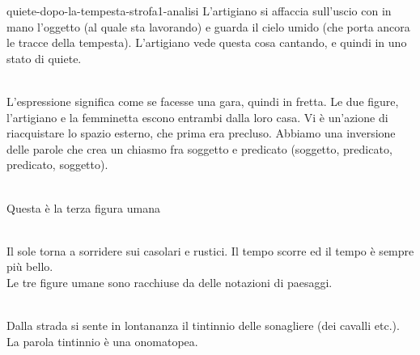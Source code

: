 \documentclass[preview]{standalone}
\begin{document}
\begin{snippet}{quiete-dopo-la-tempesta-strofa1-analisi}
    L'artigiano si affaccia sull'uscio con in mano l'oggetto (al quale sta lavorando)
    e guarda il cielo umido (che porta ancora le tracce della tempesta).
    L'artigiano vede questa cosa cantando, e quindi in uno stato di quiete.
    \\\\

    L'espressione  significa come se facesse una gara, quindi in fretta.
    Le due figure, l'artigiano e la femminetta escono entrambi dalla loro casa.
    Vi è un'azione di riacquistare lo spazio esterno, che prima era precluso.
    Abbiamo una inversione delle parole che crea un chiasmo fra soggetto e
    predicato (soggetto, predicato, predicato, soggetto).
    \\\\

    Questa è la terza figura umana
    \\\\

    Il sole torna a sorridere sui casolari e rustici.
    Il tempo scorre ed il tempo è sempre più bello. \\
    Le tre figure umane sono racchiuse da delle notazioni di paesaggi.
    \\\\

    Dalla strada si sente in lontananza il
    tintinnio delle sonagliere (dei cavalli etc.).
    La parola tintinnio è una onomatopea.
\end{snippet}
\end{document}
